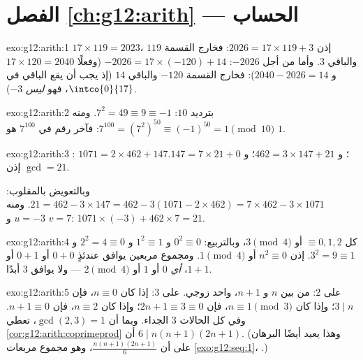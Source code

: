 \section*{الفصل \ref{ch:g12:arith} --- الحساب}

\begin{solution}{exo:g12:arith:1}
$17 \times 119 = 2023$، إذن $2026 = 17 \times 119 + 3$: فخارج القسمة $119$
والباقي $3$. وأما من أجل $-2026$: $-2026 = 17\times(-120) + 14$ (وفعلًا
$17 \times 120 = 2040$ و $2040 - 2026 = 14$): فخارج القسمة $-120$ والباقي
$14$ (إذ يجب أن يقع الباقي في $\intco{0}{17}$، فهو \emph{ليس} $-3$).
\end{solution}

\begin{solution}{exo:g12:arith:2}
بترديد $10$: $7^2 = 49 \equiv 9 \equiv -1$. ومنه
$7^{100} = \left(7^2\right)^{50} \equiv (-1)^{50} = 1 \pmod{10}$: فآخر رقم
في $7^{100}$ هو $1$.
\end{solution}

\begin{solution}{exo:g12:arith:3}
: $1071 = 2\times462 + 147$؛ و $462 = 3\times147 + 21$؛
و $147 = 7\times21 + 0$. إذن $\gcd = 21$.

وبالتعويض بالمقلوب: $21 = 462 - 3\times147 = 462 - 3(1071 - 2\times462)
= 7\times462 - 3\times1071$. ومنه $u = -3$ و $v = 7$:
$1071\times(-3) + 462\times7 = 21$.
\end{solution}

\begin{solution}{exo:g12:arith:4}
كل  $\equiv 0, 1, 2$ أو $3 \pmod 4$، وبالتربيع:
$0^2 \equiv 0$ و $1^2 \equiv 1$ و $2^2 = 4 \equiv 0$ و $3^2 = 9 \equiv 1$. إذن
$n^2 \equiv 0$ أو $1 \pmod 4$. ومجموع مربعين يوافق عندئذٍ
$0 + 0$ أو $0 + 1$ أو $1 + 1$، \emph{أي} $0$ أو $1$ أو $2 \pmod 4$ ---
ولا يوافق $3$ أبدًا.
\end{solution}

\begin{solution}{exo:g12:arith:5}
 على $2$: من بين $n$ و $n + 1$، واحد زوجي.  على
$3$: إذا كان $n \equiv 0$، فإن $3 \mid n$؛ وإذا كان $n \equiv 1 \pmod 3$، فإن
$2n + 1 \equiv 3 \equiv 0$؛ وإذا كان $n \equiv 2$، فإن $n + 1 \equiv 0$. وفي كل
الحالات  $3$ الجداء. وبما أن $\gcd(2,3) = 1$، تعطي
\cref{cor:g12:arith:coprimeprod} أن $6 \mid n(n+1)(2n+1)$.
(وهذا يعيد أيضًا البرهان على أن $\frac{n(n+1)(2n+1)}{6}$، وهو مجموع مربعات
\cref{exo:g12:seq:1}، .)
\end{solution}

